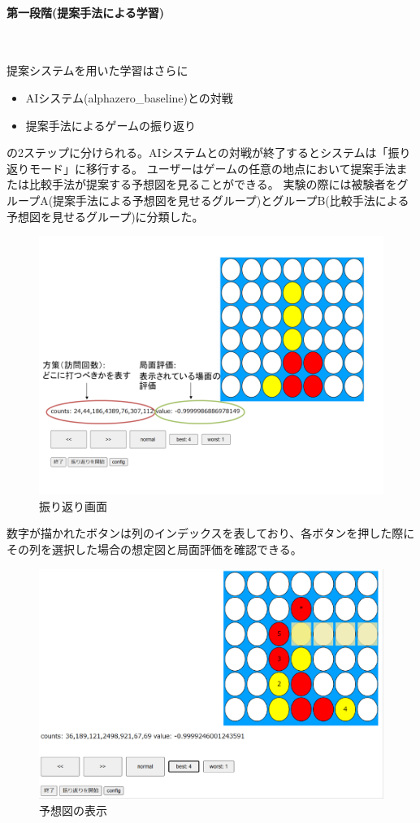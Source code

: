 \paragraph{第一段階(提案手法による学習)}~
\par 提案システムを用いた学習はさらに
\begin{itemize}
	\item AIシステム(alphazero\_baseline)との対戦
	\item 提案手法によるゲームの振り返り
\end{itemize}
の2ステップに分けられる。AIシステムとの対戦が終了するとシステムは「振り返りモード」に移行する。
ユーザーはゲームの任意の地点において提案手法または比較手法が提案する予想図を見ることができる。
実験の際には被験者をグループA(提案手法による予想図を見せるグループ)とグループB(比較手法による予想図を見せるグループ)に分類した。
\begin{figure}[t]
	\centering
	\includegraphics[width=\linewidth]{./figure/lookBack.png}
	\caption{振り返り画面}
	\label{fig:lookBack}
\end{figure}
数字が描かれたボタンは列のインデックスを表しており、各ボタンを押した際にその列を選択した場合の想定図と局面評価を確認できる。
\begin{figure}[t]
    \centering
    \includegraphics[width=\linewidth]{./figure/trajSystem.pdf}
	\caption{予想図の表示}
	\label{fig:trajSystem}
\end{figure}
